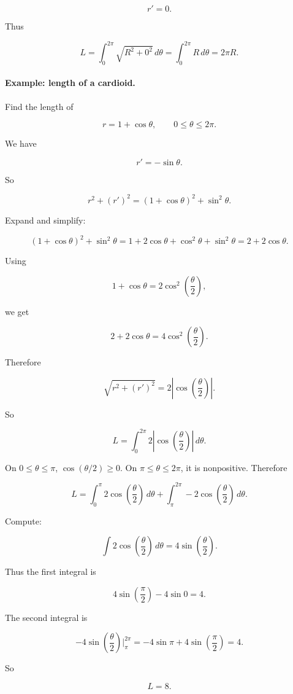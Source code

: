 \[
r'=0.
\]

Thus

\[
L=\int_0^{2\pi}\sqrt{R^2+0^2}\,d\theta
=
\int_0^{2\pi}R\,d\theta
=
\boxed{2\pi R}.
\]

\paragraph{Example: length of a cardioid.}
Find the length of

\[
r=1+\cos\theta,
\qquad
0\le\theta\le2\pi.
\]

We have

\[
r'=-\sin\theta.
\]

So

\[
r^2+(r')^2
=
(1+\cos\theta)^2+\sin^2\theta.
\]

Expand and simplify:

\[
(1+\cos\theta)^2+\sin^2\theta
=
1+2\cos\theta+\cos^2\theta+\sin^2\theta
=
2+2\cos\theta.
\]

Using

\[
1+\cos\theta=2\cos^2\left(\frac{\theta}{2}\right),
\]

we get

\[
2+2\cos\theta
=
4\cos^2\left(\frac{\theta}{2}\right).
\]

Therefore

\[
\sqrt{r^2+(r')^2}
=
2\left|\cos\left(\frac{\theta}{2}\right)\right|.
\]

So

\[
L=\int_0^{2\pi}
2\left|\cos\left(\frac{\theta}{2}\right)\right|\,d\theta.
\]

On \(0\le\theta\le\pi\), \(\cos(\theta/2)\ge0\).  On \(\pi\le\theta\le2\pi\), it is
nonpositive.  Therefore

\[
L=
\int_0^\pi 2\cos\left(\frac{\theta}{2}\right)\,d\theta
+
\int_\pi^{2\pi} -2\cos\left(\frac{\theta}{2}\right)\,d\theta.
\]

Compute:

\[
\int 2\cos\left(\frac{\theta}{2}\right)\,d\theta
=
4\sin\left(\frac{\theta}{2}\right).
\]

Thus the first integral is

\[
4\sin\left(\frac{\pi}{2}\right)-4\sin0=4.
\]

The second integral is

\[
-4\sin\left(\frac{\theta}{2}\right)\Big|_\pi^{2\pi}
=
-4\sin\pi+4\sin\left(\frac{\pi}{2}\right)
=
4.
\]

So

\[
\boxed{
L=8.
}
\]

